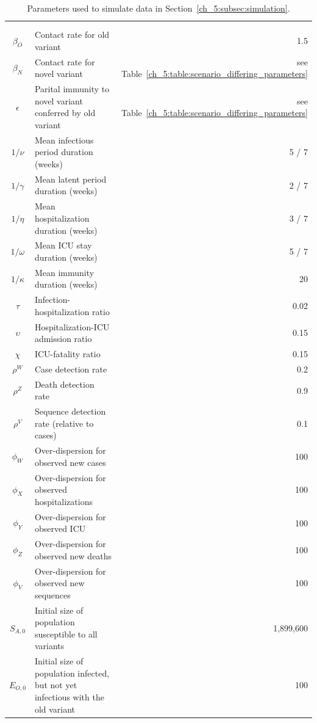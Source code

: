 \begin{xltabular}{\columnwidth}{c>{\RaggedRight}Xr}
\label{ch_5:tbl:simulation_parameters_and_interpretations}\\
\caption{Parameters used to simulate data in Section~\ref{ch_5:subsec:simulation}.}\\[\belowcaptionskip]
 &  &  \\ \hline
\( \beta_{O} \)  & Contact rate for old variant & 1.5 \\
\( \beta_{N} \)  & Contact rate for novel variant &  see Table~\ref{ch_5:table:scenario_differing_parameters} \\
\( \epsilon \) & Parital immunity to novel variant conferred by old variant & see Table~\ref{ch_5:table:scenario_differing_parameters} \\
\( 1 / \nu \) & Mean infectious period duration (weeks) & 5 / 7 \\
\( 1 / \gamma \) & Mean latent period duration (weeks) & 2 / 7 \\
\( 1 / \eta \) & Mean hospitalization duration (weeks) & 3 / 7 \\
\( 1 / \omega \) & Mean ICU stay duration (weeks) & 5 / 7 \\
\( 1 / \kappa \) & Mean immunity duration (weeks) & 20 \\
\( \tau \) & Infection-hospitalization ratio & 0.02 \\
\( \upsilon \) & Hospitalization-ICU admission ratio & 0.15 \\
\( \chi \) & ICU-fatality ratio & 0.15 \\
\( \rho^W \) & Case detection rate & 0.2 \\
\( \rho^Z \) & Death detection rate & 0.9 \\
\( \rho^V \) & Sequence detection rate (relative to cases) & 0.1 \\
\( \phi_W \) & Over-dispersion for observed new cases & 100 \\
\( \phi_X \) & Over-dispersion for observed hospitalizations & 100 \\
\( \phi_Y \) & Over-dispersion for observed ICU & 100 \\
\( \phi_Z \) & Over-dispersion for observed new deaths & 100 \\
\( \phi_V \) & Over-dispersion for observed new sequences & 100 \\
\( S_{A,0} \) & Initial size of population susceptible to all variants & 1,899,600 \\
\( E_{O,0} \) & Initial size of population infected, but not yet infectious with the old variant & 100 \\

\end{xltabular}
